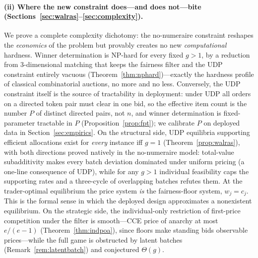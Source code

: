 \documentclass[11pt]{article}
\theoremstyle{remark}
\begin{document}
\paragraph{(ii) Where the new constraint does---and does not---bite
(Sections~\ref{sec:walras}--\ref{sec:complexity}).}
We prove a complete complexity dichotomy: the no-numeraire constraint
reshapes the \emph{economics} of the problem but provably creates no new
\emph{computational} hardness. Winner determination is NP-hard for every
fixed $g>1$, by a reduction from 3-dimensional matching that keeps the
fairness filter and the UDP constraint entirely vacuous
(Theorem~\ref{thm:nphard})---exactly the hardness profile of classical
combinatorial auctions, no more and no less. Conversely, the UDP constraint
itself is the source of tractability in deployment: under UDP all orders on
a directed token pair must clear in one bid, so the effective item count is
the number $P$ of distinct directed pairs, not $n$, and winner determination
is fixed-parameter tractable in $P$ (Proposition~\ref{prop:fpt}); we
calibrate $P$ on deployed data in Section~\ref{sec:empirics}. On the
structural side, UDP equilibria supporting efficient allocations exist
for \emph{every} instance iff $g=1$ (Theorem~\ref{prop:walras}), with both
directions proved natively in the no-numeraire model: total-value
subadditivity makes every batch deviation dominated under uniform pricing
(a one-line consequence of UDP), while for any $g>1$ individual
feasibility caps the supporting rates and a three-cycle of overlapping
batches refutes them. At the trader-optimal equilibrium the price system
\emph{is} the fairness-floor system, $w_j=c_j$. This is the formal sense
in which the deployed design approximates a nonexistent equilibrium. On
the strategic side, the individual-only restriction of first-price
competition under the filter is smooth---CCE price of anarchy at most
$e/(e-1)$ (Theorem~\ref{thm:indpoa}), since floors make standing bids
observable prices---while the full game is obstructed by latent batches
(Remark~\ref{rem:latentbatch}) and conjectured $\Theta(g)$.
\end{document}
